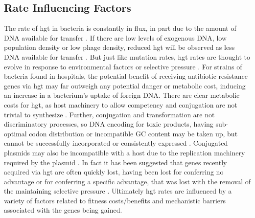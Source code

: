 \subsection{Rate Influencing Factors}
The rate of \ac{hgt} in bacteria is constantly in flux, in part due to the amount of DNA available for transfer \citep{trendbs}.
If there are low levels of exogenous DNA, low population density or low phage density, reduced \ac{hgt} will be observed as less DNA available for transfer \citep{lgt}.
But just like mutation rates, \ac{hgt} rates are thought to evolve in response to environmental factors or selective pressure \citep{mtrate,hgtrate}.
For strains of bacteria found in hospitals, the potential benefit of receiving antibiotic resistance genes via \ac{hgt} may far outweigh any potential danger or metabolic cost, inducing an increase in a bacterium's uptake of foreign DNA. \citep{hospital}
There are clear metabolic costs for \ac{hgt}, as host machinery to allow competency and conjugation are not trivial to synthesize \citep{hgtcost}.
Further, conjugation and transformation are not discriminatory processes, so DNA encoding for toxic products, having sub-optimal codon distribution or incompatible GC content may be taken up, but cannot be successfully incorporated or consistently expressed \citep{hgtcost}.
Conjugated plasmids may also be incompatible with a host due to the replication machinery required by the plasmid \citep{plasincom}.
In fact it has been suggested that genes recently acquired via \ac{hgt} are often quickly lost, having been lost for conferring no advantage or for conferring a specific advantage, that was lost with the removal of the maintaining selective pressure \citep{fastlane}.
Ultimately \ac{hgt} rates are influenced by a variety of factors related to fitness costs/benefits and mechanistic barriers associated with the genes being gained.
